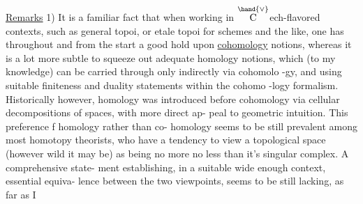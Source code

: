 \uline{Remarks}  1)  It is a familiar fact that when working in $\overset{\hand{\vee}}{\mathrm{C}}$ech-flavored
contexts,  such as general topoi,  or etale topoi for schemes and the like,
one has throughout and from the start a good hold upon \uline{cohomology} notions,
whereas it is a lot more subtle to squeeze out adequate homology notions,
which (to my knowledge) can be carried through only indirectly via cohomolo%
-gy,  and using suitable finiteness and duality statements within the cohomo%
-logy formalism.  Historically however,  homology was introduced before
cohomology via cellular decompositions of spaces,  with  more direct ap-%
peal to geometric intuition.  This preference f homology rather than co-%
homology seems to be  still prevalent among most homotopy theorists, who
have a tendency to view a topological space (however wild it may be) as
being no more no less than it's singular complex.  A comprehensive state-%
ment establishing,  in a suitable wide enough context,  essential equiva-%
lence between the two viewpoints,  seems to be still lacking,  as far as I


